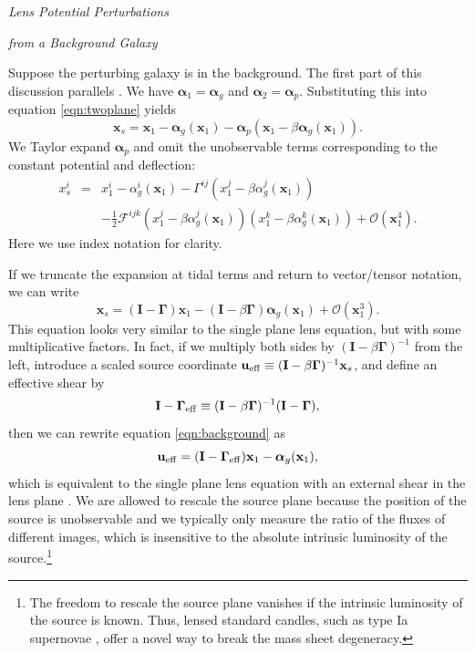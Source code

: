 \documentclass{emulateapj}
\newcommand\I[0]{\mathbf{I}}
\newcommand\GammaMat[0]{\boldsymbol{\Gamma}}
\newcommand\x[0]{\mathbf{x}}
\renewcommand\vec[1]{\mathbf{#1}}
\newcommand\al[0]{\boldsymbol{\alpha}}
\newcommand\sF{{\mathcal F}}
\begin{document}
\medskip
\centerline{\emph{Lens Potential Perturbations}}
\centerline{\emph{from a Background Galaxy}}
\medskip

Suppose the perturbing galaxy is in the background. The first part of this discussion parallels \citet{Keeton03}.  We have $\al_1 = \al_g$ and $\al_2 = \al_p$. Substituting this into equation \ref{eqn:twoplane} yields
\begin{equation}
\x_s = \x_1 - \al_g(\x_1) - \al_p(\x_1 - \beta \al_g(\x_1)). 
\end{equation}
We Taylor expand $\al_p$ and omit the unobservable terms corresponding to the constant potential and deflection:
\begin{eqnarray}
x^i_s &=& x^i_1 - \alpha^i_g(\x_1) - \Gamma^{ij} (x^j_1 - \beta \alpha^j_g(\x_1)) \\
&&- \frac{1}{2} \sF^{ijk} (x^j_1 - \beta \alpha^j_g(\x_1)) (x^k_1 - \beta \alpha^k_g(\x_1)) + \mathcal{O}(\x_1^4) . \nonumber
\end{eqnarray}
Here we use index notation for clarity.

If we truncate the expansion at tidal terms and return to vector/tensor notation, we can write
\begin{equation}
\label{eqn:background}
\x_s = (\I - \GammaMat) \x_1  - (\I - \beta \GammaMat)\al_g(\x_1) + \mathcal{O}(\x_1^3).
\end{equation}
This equation looks very similar to the single plane lens equation, but with some multiplicative factors. In fact, if we multiply both sides by $(\I - \beta \GammaMat)^{-1}$ from the left, introduce a scaled source coordinate $\vec{u}_{\rm eff} \equiv (\I - \beta \GammaMat)^{-1} \x_s$, and define an effective shear by
\begin{equation}\label{eqn:Geff}
\I -\GammaMat_{\rm eff} \equiv (\I - \beta\GammaMat)^{-1} (\I - \GammaMat) ,
\end{equation}
then we can rewrite equation \ref{eqn:background} as
\begin{equation}
\vec{u}_{\rm eff} = (\I - \GammaMat_{\rm eff}) \x_1 - \al_g(\x_1),
\end{equation}
which is equivalent to the single plane lens equation with an external shear in the lens plane \citep[see also][]{Schneider97}. We are allowed to rescale the source plane because the position of the source is unobservable and we typically only measure the ratio of the fluxes of different images, which is insensitive to the absolute intrinsic luminosity of the source.\footnote{The freedom to rescale the source plane vanishes if the intrinsic luminosity of the source is known.  Thus, lensed standard candles, such as type Ia supernovae \citep{Kelly15, Patel14, Kolatt98}, offer a novel way to break the mass sheet degeneracy.}
\end{document}
